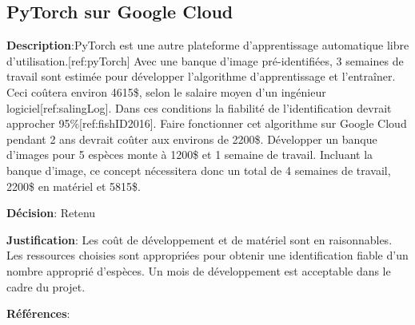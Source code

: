 

\subsection{PyTorch sur Google Cloud}
\label{s:identifier_conc3}

\textbf{Description}:PyTorch est une autre plateforme d’apprentissage automatique libre d’utilisation.[ref:pyTorch]  Avec une banque d’image pré-identifiées, 3 semaines de travail sont estimée pour développer l'algorithme d’apprentissage et l’entraîner. Ceci coûtera environ 4615\$, selon le salaire moyen d’un ingénieur logiciel[ref:salingLog]. Dans ces conditions la fiabilité de l’identification devrait approcher 95\%[ref:fishID2016]. Faire fonctionner cet algorithme sur Google Cloud pendant 2 ans devrait coûter aux environs de 2200\$. Développer un banque d’images pour 5 espèces monte à 1200\$ et 1 semaine de travail. Incluant la banque d’image, ce concept nécessitera donc un total de 4 semaines de travail, 2200\$ en matériel et 5815\$.

\textbf{Décision}: Retenu

\textbf{Justification}: Les coût de développement et de matériel sont en raisonnables. Les ressources choisies sont appropriées pour obtenir une identification fiable d’un nombre approprié d’espèces. Un mois de développement est acceptable dans le cadre du projet.

\textbf{Références}:
\cite{pytorch, googCloud, fishID_2016, sal_ingLog} 	